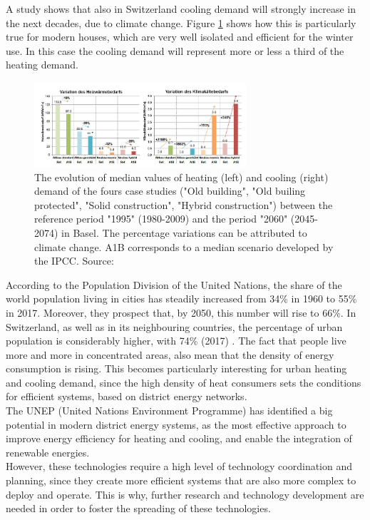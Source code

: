 \documentclass{article}
\begin{document}
A study shows that also in Switzerland cooling demand will strongly increase in the next decades, due to climate change. Figure \ref{fig:climat_CH} shows how this is particularly true for modern houses, which are very well isolated and efficient for the winter use. In this case the cooling demand will represent more or less a third of the heating demand\cite{hsluClimaBauPlanenAngesichts2017}.\\

\begin{figure}[h!]
	\centering
	\includegraphics[width=0.7\textwidth]{climat_CH.JPG}
	\caption{The evolution of median values of heating (left) and cooling (right) demand of the fours case studies ("Old building", "Old builing protected", "Solid construction", "Hybrid construction") between the reference period "1995" (1980-2009) and the period "2060" (2045-2074) in Basel. The percentage variations can be attributed to climate change. A1B corresponds to a median scenario developed by the IPCC. Source: \cite{hsluClimaBauPlanenAngesichts2017}}
	\label{fig:climat_CH}
\end{figure}


According to the Population Division of the United Nations, the share of the world population living in cities has steadily increased from 34\% in 1960 to 55\% in 2017. Moreover, they prospect that, by 2050, this number will rise to 66\%. In Switzerland, as well as in its neighbouring countries, the percentage of urban population is considerably higher, with 74\% (2017) \cite{unitednationspopulationdivisionWorldUrbanizationProspects}.
The fact that people live more and more in concentrated areas, also mean that the density of energy consumption is rising. This becomes particularly interesting for urban heating and cooling demand, since the high density of heat consumers sets the conditions for efficient  systems, based on district energy networks.\\
The UNEP (United Nations Environment Programme) has identified a big potential in modern district energy systems, as the most effective approach to improve energy efficiency for heating and cooling, and enable the integration of renewable energies. \\
However, these technologies require a high level of technology coordination and planning, since they create more efficient systems that are also more complex to deploy and operate. This is why, further research and technology development are needed in order to foster the spreading of these technologies.
\end{document}
